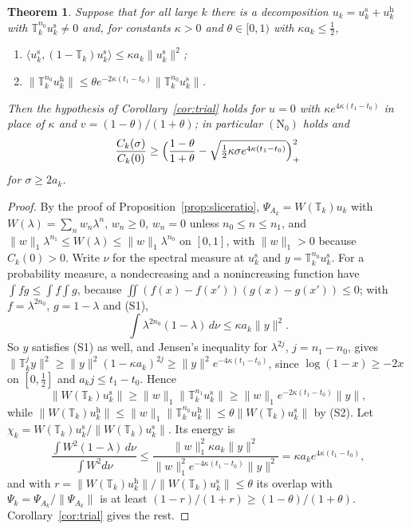 \documentclass[11pt]{amsart}
\newtheorem{theorem}{Theorem}[section]
\theoremstyle{definition}
\theoremstyle{remark}
\numberwithin{equation}{section}
\newcommand{\ip}[2]{\langle #1,#2\rangle}
\begin{document}
\begin{theorem}\label{thm:softhard}
Suppose that for all large $k$ there is a decomposition
$u_k=u^{\mathrm s}_k+u^{\mathrm h}_k$ with $\mathbb T_k^{n_0}u^{\mathrm s}_k\ne0$
and, for constants $\kappa>0$ and $\theta\in[0,1)$ with $\kappa a_k\le\frac12$,
\begin{enumerate}[label=\textup{(S\arabic*)},leftmargin=*]
\item $\ip{u^{\mathrm s}_k}{(1-\mathbb T_k)u^{\mathrm s}_k}\le\kappa a_k
\|u^{\mathrm s}_k\|^2$;
\item $\|\mathbb T_k^{n_0}u^{\mathrm h}_k\|\le\theta e^{-2\kappa(t_1-t_0)}
\|\mathbb T_k^{n_0}u^{\mathrm s}_k\|$.
\end{enumerate}
Then the hypothesis of Corollary~\textup{\ref{cor:trial}} holds for $u=0$
with $\kappa e^{4\kappa(t_1-t_0)}$ in place of $\kappa$ and
$v=(1-\theta)/(1+\theta)$; in particular $(\mathrm N_0)$ holds and
\[
\frac{C_k(\sigma)}{C_k(0)}\ge\Bigl(\frac{1-\theta}{1+\theta}-
\sqrt{\tfrac12\kappa\sigma e^{4\kappa(t_1-t_0)}}\Bigr)_+^2
\]
for $\sigma\ge2a_k$.
\end{theorem}

\begin{proof}
By the proof of Proposition~\ref{prop:sliceratio},
$\Psi_{A_k}=W(\mathbb T_k)u_k$ with $W(\lambda)=\sum_nw_n\lambda^n$, $w_n\ge0$,
$w_n=0$ unless $n_0\le n\le n_1$, and $\|w\|_1\lambda^{n_1}\le W(\lambda)\le
\|w\|_1\lambda^{n_0}$ on $[0,1]$, with $\|w\|_1>0$ because $C_k(0)>0$. Write
$\nu$ for the spectral measure at $u^{\mathrm s}_k$ and
$y=\mathbb T_k^{n_0}u^{\mathrm s}_k$. For a probability measure, a
nondecreasing and a nonincreasing function have $\int fg\le\int f\int g$,
because $\iint(f(x)-f(x'))(g(x)-g(x'))\le0$; with $f=\lambda^{2n_0}$,
$g=1-\lambda$ and (S1),
\[
\int\lambda^{2n_0}(1-\lambda)\,d\nu\le\kappa a_k\|y\|^2 .
\]
So $y$ satisfies (S1) as well, and Jensen's inequality for $\lambda^{2j}$,
$j=n_1-n_0$, gives $\|\mathbb T_k^jy\|^2\ge\|y\|^2(1-\kappa a_k)^{2j}\ge
\|y\|^2e^{-4\kappa(t_1-t_0)}$, since $\log(1-x)\ge-2x$ on $[0,\frac12]$ and
$a_kj\le t_1-t_0$. Hence
\[
\|W(\mathbb T_k)u^{\mathrm s}_k\|\ge\|w\|_1\|\mathbb T_k^{n_1}u^{\mathrm s}_k\|
\ge\|w\|_1e^{-2\kappa(t_1-t_0)}\|y\| ,
\]
while $\|W(\mathbb T_k)u^{\mathrm h}_k\|\le\|w\|_1\|\mathbb T_k^{n_0}
u^{\mathrm h}_k\|\le\theta\|W(\mathbb T_k)u^{\mathrm s}_k\|$ by (S2). Let
$\chi_k=W(\mathbb T_k)u^{\mathrm s}_k/\|W(\mathbb T_k)u^{\mathrm s}_k\|$. Its
energy is
\[
\frac{\int W^2(1-\lambda)\,d\nu}{\int W^2d\nu}\le
\frac{\|w\|_1^2\kappa a_k\|y\|^2}{\|w\|_1^2e^{-4\kappa(t_1-t_0)}\|y\|^2}
=\kappa a_ke^{4\kappa(t_1-t_0)} ,
\]
and with $r=\|W(\mathbb T_k)u^{\mathrm h}_k\|/\|W(\mathbb T_k)u^{\mathrm s}_k\|
\le\theta$ its overlap with $\Psi_k=\Psi_{A_k}/\|\Psi_{A_k}\|$ is at least
$(1-r)/(1+r)\ge(1-\theta)/(1+\theta)$. Corollary~\ref{cor:trial} gives the
rest.
\end{proof}
\end{document}
